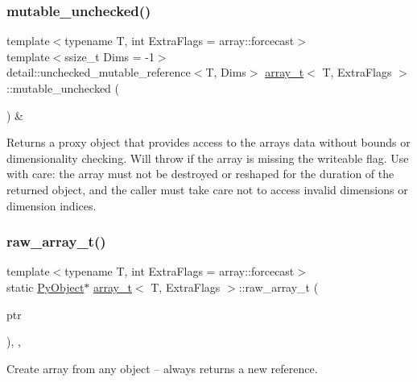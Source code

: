 \subsubsection{\texorpdfstring{mutable\_unchecked()}{mutable\_unchecked()}}
{\footnotesize\ttfamily template$<$typename T, int Extra\+Flags = array\+::forcecast$>$ \\
template$<$ssize\+\_\+t Dims = -\/1$>$ \\
detail\+::unchecked\+\_\+mutable\+\_\+reference$<$T, Dims$>$ \mbox{\hyperlink{classarray__t}{array\+\_\+t}}$<$ T, Extra\+Flags $>$\+::mutable\+\_\+unchecked (\begin{DoxyParamCaption}{ }\end{DoxyParamCaption}) \&\hspace{0.3cm}{\ttfamily [inline]}}

Returns a proxy object that provides access to the array\textquotesingle{}s data without bounds or dimensionality checking. Will throw if the array is missing the {\ttfamily writeable} flag. Use with care\+: the array must not be destroyed or reshaped for the duration of the returned object, and the caller must take care not to access invalid dimensions or dimension indices. \mbox{\label{classarray__t_a49bc4cbb7ac30eb5ddbfa8df992d897d}} 
\subsubsection{\texorpdfstring{raw\_array\_t()}{raw\_array\_t()}}
{\footnotesize\ttfamily template$<$typename T, int Extra\+Flags = array\+::forcecast$>$ \\
static \mbox{\hyperlink{_python27_2object_8h_aadc84ac7aed2cfa6f20c25f62bf3dac7}{Py\+Object}}$\ast$ \mbox{\hyperlink{classarray__t}{array\+\_\+t}}$<$ T, Extra\+Flags $>$\+::raw\+\_\+array\+\_\+t (\begin{DoxyParamCaption}\item[{\mbox{\hyperlink{_python27_2object_8h_aadc84ac7aed2cfa6f20c25f62bf3dac7}{Py\+Object}} $\ast$}]{ptr }\end{DoxyParamCaption})\hspace{0.3cm}{\ttfamily [inline]}, {\ttfamily [static]}, {\ttfamily [protected]}}



Create array from any object -- always returns a new reference. 

